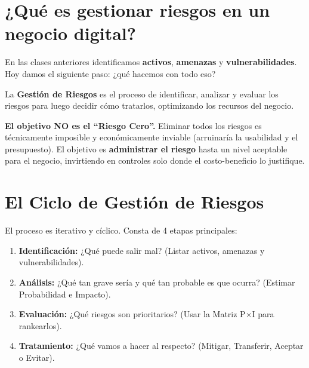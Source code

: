 \documentclass[12pt,a4paper]{article}
\begin{document}
\section{¿Qu\'e es gestionar riesgos en un negocio digital?}

En las clases anteriores identificamos \textbf{activos}, \textbf{amenazas} y \textbf{vulnerabilidades}. Hoy damos el siguiente paso: ¿qu\'e hacemos con todo eso? 

\begin{cajaDefinicion}
La \textbf{Gesti\'on de Riesgos} es el proceso de identificar, analizar y evaluar los riesgos para luego decidir c\'omo tratarlos, optimizando los recursos del negocio.
\end{cajaDefinicion}

\begin{cajaNota}
\textbf{El objetivo NO es el ``Riesgo Cero''.} Eliminar todos los riesgos es t\'ecnicamente imposible y econ\'omicamente inviable (arruinaría la usabilidad y el presupuesto). El objetivo es \textbf{administrar el riesgo} hasta un nivel aceptable para el negocio, invirtiendo en controles solo donde el costo-beneficio lo justifique.
\end{cajaNota}

\section{El Ciclo de Gesti\'on de Riesgos}

El proceso es iterativo y c\'iclico. Consta de 4 etapas principales:

\begin{cajaProceso}
\begin{enumerate}[leftmargin=2em, itemsep=8pt]
    \item \textbf{Identificaci\'on:} ¿Qu\'e puede salir mal? (Listar activos, amenazas y vulnerabilidades).
    \item \textbf{An\'alisis:} ¿Qu\'e tan grave ser\'ia y qu\'e tan probable es que ocurra? (Estimar Probabilidad e Impacto).
    \item \textbf{Evaluaci\'on:} ¿Qu\'e riesgos son prioritarios? (Usar la Matriz P$\times$I para rankearlos).
    \item \textbf{Tratamiento:} ¿Qu\'e vamos a hacer al respecto? (Mitigar, Transferir, Aceptar o Evitar).
\end{enumerate}
\end{cajaProceso}
\end{document}
